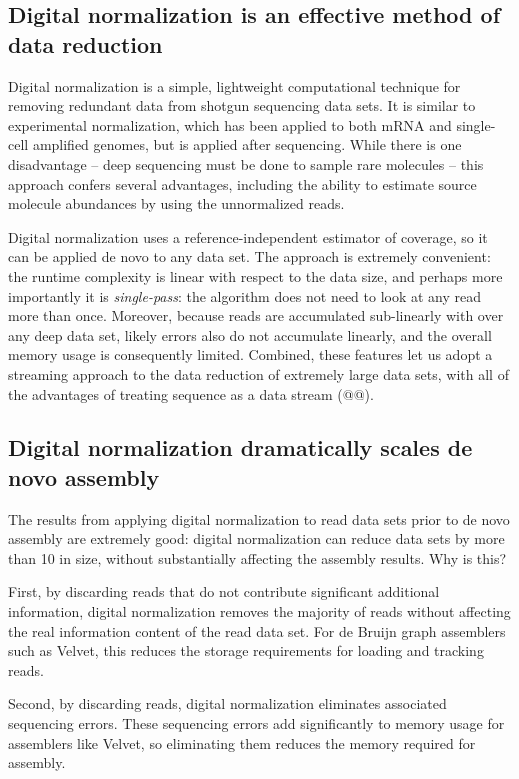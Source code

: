 \documentclass[10pt]{article}
\begin{document}
\subsection*{Digital normalization is an effective method of data reduction}

Digital normalization is a simple, lightweight computational technique
for removing redundant data from shotgun sequencing data sets.  It is
similar to experimental normalization, which has been applied to both
mRNA and single-cell amplified genomes, but is applied after
sequencing.  While there is one disadvantage -- deep sequencing must
be done to sample rare molecules -- this approach confers several
advantages, including the ability to estimate source molecule abundances by
using the unnormalized reads.

Digital normalization uses a reference-independent estimator of
coverage, so it can be applied de novo to any data set.  The approach
is extremely convenient: the runtime complexity is linear with respect
to the data size, and perhaps more importantly it is {\em
single-pass}: the algorithm does not need to look at any read more
than once.  Moreover, because reads are accumulated sub-linearly with
over any deep data set, likely errors also do not accumulate linearly,
and the overall memory usage is consequently limited.  Combined, these
features let us adopt a streaming approach to the data reduction of
extremely large data sets, with all of the advantages of treating
sequence as a data stream (@@).

\subsection*{Digital normalization dramatically scales de novo assembly}

The results from applying digital normalization to read data sets
prior to de novo assembly are extremely good: digital normalization
can reduce data sets by more than 10 in size, without substantially
affecting the assembly results.  Why is this?

First, by discarding reads that do not contribute significant
additional information, digital normalization removes the majority of
reads without affecting the real information content of the read data
set.  For de Bruijn graph assemblers such as Velvet, this reduces the
storage requirements for loading and tracking reads.

Second, by discarding reads, digital normalization eliminates
associated sequencing errors.  These sequencing errors add
significantly to memory usage for assemblers like Velvet, so
eliminating them reduces the memory required for assembly.
\end{document}
